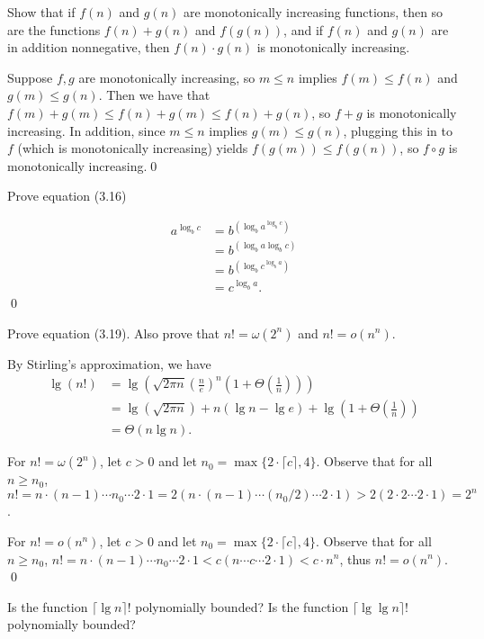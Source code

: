  Show that if $f(n)$ and $g(n)$ are monotonically increasing functions, then so are the functions $f(n) + g(n)$ and $f(g(n))$, and if $f(n)$ and $g(n)$ are in addition nonnegative, then $f(n) \cdot g(n)$ is monotonically increasing.

\sol Suppose $f, g$ are monotonically increasing, so $m \leq n$ implies $f(m) \leq f(n)$ and $g(m) \leq g(n)$. Then we have that $f(m) + g(m) \leq f(n) + g(m) \leq f(n) + g(n)$, so $f + g$ is monotonically increasing. In addition, since $m \leq n$ implies $g(m) \leq g(n)$, plugging this in to $f$ (which is monotonically increasing) yields $f(g(m)) \leq f(g(n))$, so $f\circ g$ is monotonically increasing.\qed

 Prove equation (3.16)

\pf
\begin{align*}
    a^{\log_b c} &= b^{\left(\log_b a^{\log_b c}\right)} \\
    &= b^{\left(\log_b a \log_b c\right)} \\
    &= b^{\left(\log_b c^{\log_b a}\right)} \\
    &= c^{\log_b a}.
\end{align*}\qed

 Prove equation (3.19). Also prove that $n! = \omega(2^n)$ and $n! = o(n^n)$.

\pf By Stirling's approximation, we have
\begin{align*}
    \lg (n!) &= \lg\left(\sqrt{2\pi n} \left(\frac{n}{e}\right)^n \left(1 + \Theta\left(\frac{1}{n}\right)\right)\right)\\
    &= \lg(\sqrt{2\pi n}) + n (\lg n - \lg e) + \lg\left(1 + \Theta\left(\frac{1}{n}\right)\right)\\
    &= \Theta(n \lg n).
\end{align*}

For $n! = \omega(2^n)$, let $c > 0$ and let $n_0 = \max\{2\cdot\lceil c\rceil, 4\}$. Observe that for all $n \geq n_0$, $n! = n\cdot(n-1)\cdots n_0 \cdots 2\cdot 1 = 2(n \cdot (n-1) \cdots (n_0 / 2) \cdots 2 \cdot 1) > 2(2\cdot 2 \cdots 2\cdot 1) = 2^n$.

For $n! = o(n^n)$, let $c > 0$ and let $n_0 = \max\{2\cdot \lceil c \rceil, 4\}$. Observe that for all $n \geq n_0$, $n! = n\cdot (n-1) \cdots n_0 \cdots 2 \cdot 1 < c (n \cdots c \cdots 2 \cdot 1) < c\cdot n^n$, thus $n! = o(n^n)$.
\qed

 Is the function $\lceil \lg n \rceil !$ polynomially bounded? Is the function $\lceil \lg \lg n \rceil !$ polynomially bounded?

